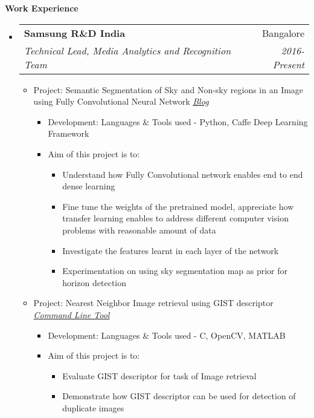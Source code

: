 \documentclass[letterpaper,11pt]{article}
\makeatletter
\def\CC{{C\nolinebreak[4]\hspace{-.05em}\raisebox{.4ex}{\tiny\bf ++}}}
\newcommand{\resitem}[1]{\item #1 \vspace{-2pt}}
\newcommand{\resheading}[1]{{\large \colorbox{mygrey}{\begin{minipage}{\textwidth}{\textbf{#1 \vphantom{p\^{E}}}}\end{minipage}}}}
\newcommand{\ressubheading}[4]{
	\begin{tabular*}{7.0in}{l@{\extracolsep{\fill}}r}
		\textbf{#1} & #2 \\
		\textit{#3} & \textit{#4} \\
	\end{tabular*}\vspace{-6pt}}
\makeatother
\begin{document}
\resheading{Work Experience}
\begin{itemize}
	\item
		\ressubheading{Samsung R\&D India}{Bangalore}{Technical Lead, Media Analytics and Recognition Team}{2016-Present}
		\vspace{1mm}
		\begin{itemize}
				\resitem[]{\faCircleO
					\hspace{1mm}Project: Semantic Segmentation of Sky and Non-sky regions in an Image using Fully Convolutional Neural Network
					\faGlobe \hspace{1mm} \href{https://nrupatunga.github.io/}{\emph{Blog}}}
				\begin{itemize}
						\resitem{Development: Languages \& Tools used - Python, Caffe Deep Learning Framework}
				\end{itemize}
				\begin{itemize}
						\resitem{Aim of this project is to:}
						\begin{itemize}
								\resitem{Understand how Fully Convolutional network enables end to end dense learning}
								\resitem{Fine tune the weights of the pretrained model, appreciate how transfer learning enables 
									to address different computer vision problems with reasonable amount of data}
								\resitem{Investigate the features learnt in each layer of the network}
								\resitem{Experimentation on using sky segmentation map as prior for horizon detection}
						\end{itemize}
				\end{itemize}
				\vspace{1mm}
				\resitem[]{\faCircleO \hspace{1mm}Project: Nearest Neighbor Image retrieval using GIST descriptor
					\faWrench \hspace{1mm} \href{https://github.com/nrupatunga/GIST-global-Image-Descripor}{\emph{Command Line Tool}}}
				\begin{itemize}
						\resitem{Development: Languages \& Tools used - \CC, OpenCV, MATLAB}
				\end{itemize}
				\begin{itemize}
						\resitem{Aim of this project is to:}
						\begin{itemize}
								\resitem{Evaluate GIST descriptor for task of Image retrieval}
								\resitem{Demonstrate how GIST descriptor can be used for detection of duplicate images}
						\end{itemize}

\end{itemize}
\end{itemize}
\end{itemize}
\end{document}
